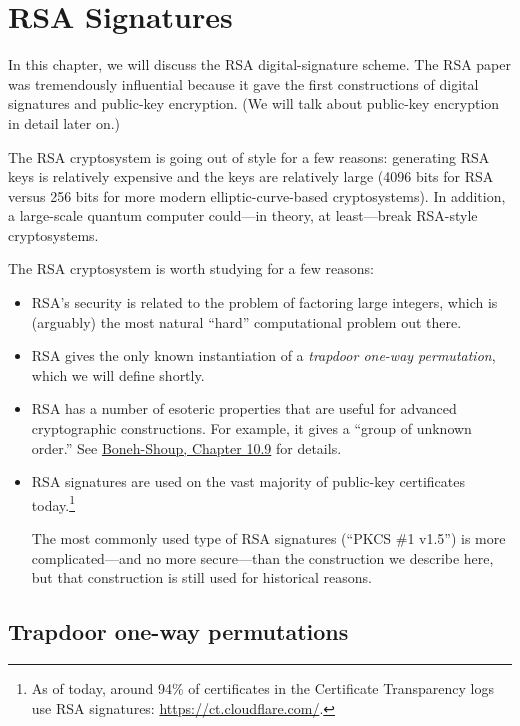 
\chapter{RSA Signatures}

In this chapter, we will discuss the RSA digital-signature scheme.
The RSA paper\autocite{RSA} was tremendously influential because it gave
the first constructions of digital signatures and public-key encryption.
(We will talk about public-key encryption in detail later on.)

The RSA cryptosystem is going out of style for a few reasons: 
generating RSA keys is relatively expensive and the keys are relatively large
(4096 bits for RSA versus 256 bits for more modern elliptic-curve-based cryptosystems).
In addition, a large-scale quantum computer could---in theory, at least---break
RSA-style cryptosystems.

The RSA cryptosystem is worth studying for a few reasons:
\begin{itemize}
  \item RSA's security is related to the problem of factoring large integers,
        which is (arguably) the most natural ``hard'' computational problem
        out there.
       
  \item RSA gives the only known instantiation of a \emph{trapdoor one-way permutation},
        which we will define shortly.

  \item RSA has a number of esoteric properties that are useful for advanced
        cryptographic constructions. For example, it gives a ``group of unknown order.''
        See
    \href{https://toc.cryptobook.us/book.pdf#page=436}{Boneh-Shoup, Chapter 10.9} for details.

  \item RSA signatures are used on the vast majority of public-key certificates today.\footnote{As
    of today, around 94\% of certificates in the Certificate Transparency logs use RSA signatures:
\url{https://ct.cloudflare.com/}.}

The most commonly used type of RSA signatures (``PKCS \#1 v1.5'') is
more complicated---and no more secure---than the
construction we describe here, but that
construction is still used for historical reasons.

\end{itemize}

\section{Trapdoor one-way permutations}

